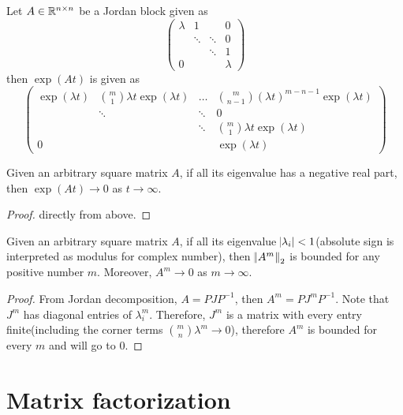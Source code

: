 \begin{refsection}
\begin{lemma}
Let $A\in \mathbb{R}^{n\times n}$ be a Jordan block given as
$$
\begin{pmatrix}
\lambda & 1 & ~ & 0\\
~ & \ddots & \ddots & 0 \\
~ & ~ & \ddots & 1 \\
0 & ~ & ~ & \lambda
\end{pmatrix}$$
then $\exp(At)$ is given as 
$$
\begin{pmatrix}
\exp(\lambda t) & \binom{m}{1 }\lambda t \exp(\lambda t) & \dots & \binom{m}{n-1}(\lambda t)^{m-n-1}\exp(\lambda t) \\
~ & \ddots & \ddots & 0 \\
~ & ~ & \ddots & \binom{m}{1 }\lambda t \exp(\lambda t) \\
0 & ~ & ~ & \exp(\lambda t)
\end{pmatrix}$$
\end{lemma}

\begin{lemma}
Given an arbitrary square matrix $A$, if all its eigenvalue has a negative real part, then $\exp(At) \to 0$ as $t \to \infty$.
\end{lemma}
\begin{proof}
directly from above.
\end{proof}



\begin{lemma}\label{ch:linearalgebra:th:boundedmatrixpower}
Given an arbitrary square matrix $A$, if all its eigenvalue $\abs{\lambda_i} < 1$(absolute sign is interpreted as modulus for complex number), then $\norm{A^m}_2$ is bounded for any positive number $m$.
Moreover, $A^m \to 0$ as $m \to \infty$.
\end{lemma}
\begin{proof}
From Jordan decomposition, $A = PJP^{-1}$, then
$A^m = P J^m P^{-1}$. Note that $J^m$ has diagonal entries of $\lambda^m_i$. Therefore, $J^m$ is a matrix with every entry finite(including the corner terms $\binom{m}{n} \lambda^m \to 0$), therefore $A^m$ is bounded for every $m$ and will go to 0.
\end{proof}




\section{Matrix factorization}

\end{refsection}
